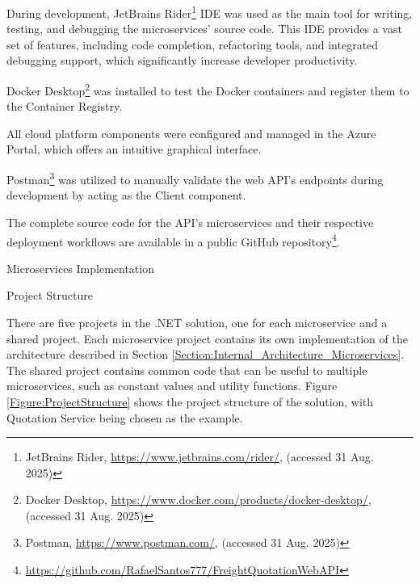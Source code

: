 \documentclass[12pt,reqno, oneside]{amsbook}
\makeatletter
\def\section{\@startsection{section}{1}%
      \z@{.5\linespacing\@plus.7\linespacing}{.25\linespacing}%
      {\normalfont\bfseries\flushleft}}
\def\subsection{\@startsection{subsection}{2}%
      \z@{.5\linespacing\@plus.7\linespacing}{.25\linespacing}%
      {\normalfont\bfseries\flushleft}}
\theoremstyle{definition}
\theoremstyle{definition}
\numberwithin{section}{chapter}
\numberwithin{table}{chapter}
\numberwithin{figure}{chapter}
\makeatother
\begin{document}
During development, JetBrains Rider\footnote{JetBrains Rider, \url{https://www.jetbrains.com/rider/}, (accessed 31 Aug. 2025)} \ac{IDE} was used as the main tool for writing, testing, and debugging the microservices' source code. This \ac{IDE} provides a vast set of features, including code completion, refactoring tools, and integrated debugging support, which significantly increase developer productivity.

Docker Desktop\footnote{Docker Desktop, \url{https://www.docker.com/products/docker-desktop/}, (accessed 31 Aug. 2025)} was installed to test the Docker containers and register them to the Container Registry.

All cloud platform components were configured and managed in the Azure Portal, which offers an intuitive graphical interface.

Postman\footnote{Postman, \url{https://www.postman.com/}, (accessed 31 Aug. 2025)} was utilized to manually validate the web \ac{API}'s endpoints during development by acting as the Client component.

The complete source code for the \ac{API}'s microservices and their respective deployment workflows are available in a public GitHub repository\footnote{\url{https://github.com/RafaelSantos777/FreightQuotationWebAPI}}.

\pagebreak

\section{Microservices Implementation}

\subsection{Project Structure}

There are five projects in the .NET solution, one for each microservice and a shared project. Each microservice project contains its own implementation of the architecture described in Section \ref{Section:Internal_Architecture_Microservices}. The shared project contains common code that can be useful to multiple microservices, such as constant values and utility functions.
Figure \ref{Figure:ProjectStructure} shows the project structure of the solution, with Quotation Service being chosen as the example.
\end{document}
